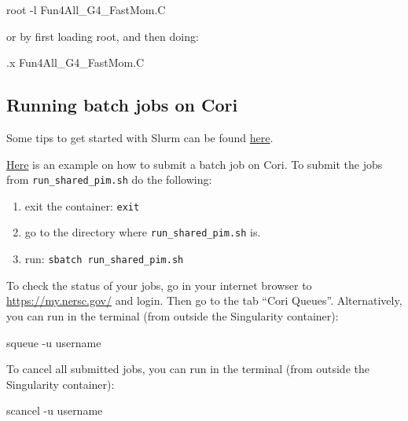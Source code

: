 \documentclass[12pt]{article}
\begin{document}
\begin{tcolorbox}
\begin{verbnobox}[\scriptsize]
root -l Fun4All_G4_FastMom.C
\end{verbnobox}
\end{tcolorbox}

or by first loading root, and then doing:

\begin{tcolorbox}
\begin{verbnobox}[\scriptsize]
.x Fun4All_G4_FastMom.C
\end{verbnobox}
\end{tcolorbox}

\subsection{Running batch jobs on Cori}

Some tips to get started with Slurm can be found \href{https://slurm.schedmd.com/quickstart.html}{here}.

\href{https://github.com/eic/g4lblvtx/tree/master/cori_batch}{Here} is an example on how to submit a batch job on Cori.
To submit the jobs from \verb|run_shared_pim.sh| do the following:

\begin{enumerate}
\item exit the container: \verb|exit|
\item go to the directory where \verb|run_shared_pim.sh| is.
\item run: \verb|sbatch run_shared_pim.sh|
\end{enumerate}

To check the status of your jobs, go in your internet browser to \href{https://my.nersc.gov/}{https://my.nersc.gov/} and login.
Then go to the tab ``Cori Queues''.
Alternatively, you can run in the terminal (from outside the Singularity container):

\begin{tcolorbox}
\begin{verbnobox}[\scriptsize]
squeue -u username
\end{verbnobox}  
\end{tcolorbox}

To cancel all submitted jobs, you can run in the terminal (from outside the Singularity container):

\begin{tcolorbox}
\begin{verbnobox}[\scriptsize]
scancel -u username
\end{verbnobox}  
\end{tcolorbox}

%
%
\end{document}
